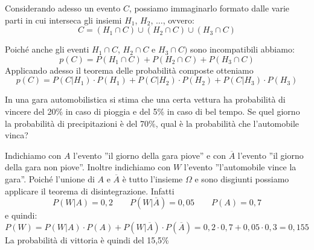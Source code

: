 Considerando adesso un evento \(C\), possiamo immaginarlo formato dalle varie 
parti in cui interseca gli insiemi \(H_1\), \(H_2\), \(\dots\), ovvero:
\[C = (H_1 \cap C) \cup (H_2 \cap C) \cup (H_3 \cap C)\]
\begin{inaccessibleblock}
 \begin{figure}[htpb]
\begin{minipage}[c]{.45\textwidth}
\end{minipage}\hfil
\begin{minipage}[c]{.45\textwidth}
\end{minipage}
\end{figure}
\end{inaccessibleblock}
Poiché anche gli eventi \(H_1 \cap C\), \(H_2 \cap C\) e \(H_3 \cap C)\) sono 
incompatibili abbiamo:
\[p(C)=P(H_1 \cap C)+P(H_2 \cap C) + P(H_3 \cap C)\]
Applicando adesso il teorema delle probabilità composte otteniamo
\[p(C)=P(C|H_1)\cdot P(H_1)+P(C|H_2)\cdot P(H_2)+P(C|H_3)\cdot P(H_3)\]
\begin{esempio}
In una gara automobilistica si stima che una certa vettura ha probabilità di 
vincere del 20\% in caso di pioggia e del 5\% in caso di bel tempo. Se quel 
giorno la probabilità di precipitazioni è del 70\%, qual è la probabilità che 
l'automobile vinca?

Indichiamo con \(A\) l'evento ''il giorno della gara piove'' 
e con \(\overline A\) l'evento ''il giorno della gara non piove''. 
Inoltre indichiamo con \(W\) l'evento ''l'automobile vince la gara''. 
Poiché l'unione di \(A\) e \(\overline A\) è tutto l'insieme \(\Omega\) e sono 
disgiunti possiamo applicare il teorema di disintegrazione. Infatti
\[P(W|A)=0,2 \qquad P(W|\overline A)=0,05 \qquad P(A)=0,7\]
e quindi:
\[P(W)=P(W|A)\cdot P(A) + P(W|\overline A)\cdot P(\overline A)=0,2 \cdot 
0,7 + 0,05 \cdot 0,3 = 0,155\]
La probabilità di vittoria è quindi del 15,5\%
\end{esempio}

